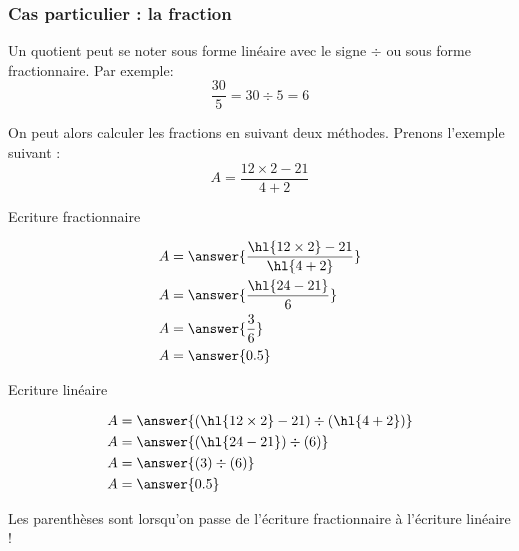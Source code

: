 \subsubsection{Cas particulier : la fraction}
\begin{remarquebox}
    Un quotient peut se noter sous forme linéaire avec le signe $\div$ ou sous
    forme fractionnaire. Par exemple: 
    $$\dfrac{30}{5}=30\div5=6$$
    
    On peut alors calculer les fractions en suivant deux méthodes. Prenons
    l'exemple suivant :
    $$A = \dfrac{12\times2-21}{4+2}$$
    \begin{minipage}{0.49\textwidth}
    \begin{center}
        Ecriture fractionnaire
    \end{center}
        \begin{align*}
            A&=\answer{\dfrac{\hl{12\times2}-21}{\hl{4+2}}}\\
            A&=\answer{\dfrac{\hl{24-21}}{6}}\\
            A&=\answer{\dfrac{3}{6}}\\
            A&=\answer{0.5}
        \end{align*}
    \end{minipage}
    \vline
    \begin{minipage}{0.49\textwidth}
    \begin{center}
        Ecriture linéaire
    \end{center}
   \begin{align*}
       A&=\answer{(\hl{12\times2}-21)\div(\hl{4+2})}\\
        A&=\answer{(\hl{24-21})\div(6)}\\
        A&=\answer{(3)\div(6)}\\
        A&=\answer{0.5}
    \end{align*}
    \end{minipage}
    
\end{remarquebox}

\begin{attentionbox}
    Les parenthèses sont  lorsqu'on passe de l'écriture
    fractionnaire à l'écriture linéaire !
\end{attentionbox}


